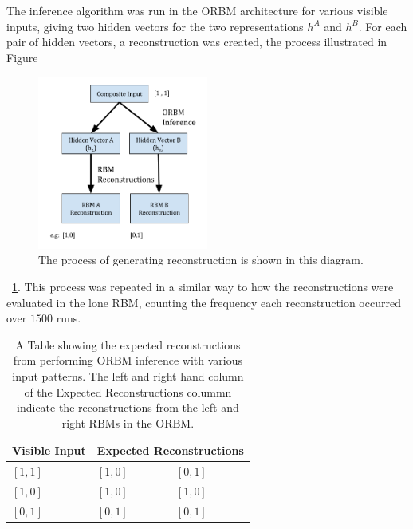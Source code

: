 The inference algorithm was run in the ORBM architecture for various visible inputs, giving two hidden vectors for the two representations $h^A$ and $h^B$. For each pair of hidden vectors, a reconstruction was created, the process illustrated in Figure
\begin{figure}[h]
  \begin{center}
    \includegraphics[width=0.5\textwidth]{Assets/XOR-2-Bit-Process-Diagram.png}
  \end{center}
  \caption{The process of generating reconstruction is shown in this diagram.}

  \label{F:Two-Bit-ORBM-Process-Diagram}
\end{figure}~\ref{F:Two-Bit-ORBM-Process-Diagram}. This process was repeated in a similar way to how the reconstructions were evaluated in the lone RBM, counting the frequency each reconstruction occurred over $1500$ runs.

\begin{table}[]
\centering
\begin{tabular}{|l|l|l|}
\hline
Visible Input & \multicolumn{2}{l|}{Expected Reconstructions} \\ \hline
$[1 , 1 ]$    & $[1, 0]$              & $[0,1]$               \\ \hline
$[1, 0 ]$     & $[1,0]$               & $[1, 0]$              \\ \hline
$[0, 1]$      & $[0,1]$               & $[0,1]$               \\ \hline
\end{tabular}
\caption{A Table showing the expected reconstructions from performing ORBM inference with various input patterns. The left and right hand column of the Expected Reconstructions colummn indicate the reconstructions from the left and right RBMs in the ORBM.}
\label{my-label}
\end{table}

